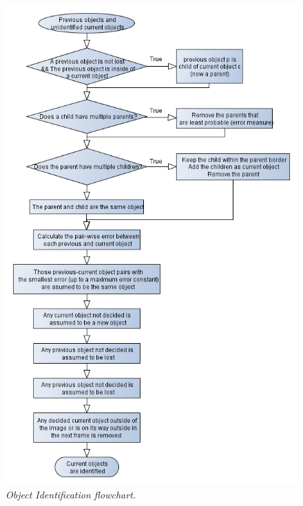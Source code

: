 \begin{figure}[htb]
	\centering
	\includegraphics[width=\linewidth]{images/data_flow_identification.png}
	\caption{\textit{Object Identification flowchart.}}
	\label{fig:ObjID_fig} %
\end{figure}
